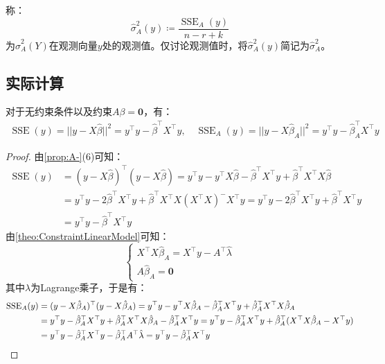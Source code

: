 \begin{definition}
	称：
	\begin{equation*}
		\hat{\sigma}_A^2(y)\coloneq\frac{\operatorname{SSE}_A(y)}{n-r+k}
	\end{equation*}
	为$\hat{\sigma}_A^2(Y)$在观测向量$y$处的观测值。仅讨论观测值时，将$\hat{\sigma}_A^2(y)$简记为$\hat{\sigma}_A^2$。
\end{definition}

\subsection{实际计算}
\begin{theorem}\label{theo:SSESSEACalculate}
	对于无约束条件以及约束$A\beta=\mathbf{0}$，有：
	\begin{gather*}
		\operatorname{SSE}(y)=||y-X\hat{\beta}||^2=y^{\top}y-\hat{\beta}^{\top}X^{\top}y,\quad
		\operatorname{SSE}_A(y)=||y-X\hat{\beta}_A||^2=y^{\top}y-\hat{\beta}_A^{\top}X^{\top}y
	\end{gather*}
\end{theorem}
\begin{proof}
	由\cref{prop:A-}(6)可知：
	\begin{align*}
		\operatorname{SSE}(y)&=(y-X\hat{\beta})^{\top}(y-X\hat{\beta})=y^{\top}y-y^{\top}X\hat{\beta}-\hat{\beta}^{\top}X^{\top}y+\hat{\beta}^{\top}X^{\top}X\hat{\beta} \\
		&=y^{\top}y-2\hat{\beta}^{\top}X^{\top}y+\hat{\beta}^{\top}X^{\top}X(X^{\top}X)^-X^{\top}y=y^{\top}y-2\hat{\beta}^{\top}X^{\top}y+\hat{\beta}^{\top}X^{\top}y \\
		&=y^{\top}y-\hat{\beta}^{\top}X^{\top}y
	\end{align*}
	由\cref{theo:ConstraintLinearModel}可知：
	\begin{equation*}
		\begin{cases}
			X^{\top}X\hat{\beta}_A=X^{\top}y-A^{\top}\hat{\lambda} \\
			A\hat{\beta}_A=\mathbf{0}
		\end{cases}
	\end{equation*}
	其中$\lambda$为Lagrange乘子，于是有：
	\begin{align*}
		\operatorname{SSE}_A(y)&=(y-X\hat{\beta}_A)^{\top}(y-X\hat{\beta}_A)=y^{\top}y-y^{\top}X\hat{\beta}_A-\hat{\beta}_A^{\top}X^{\top}y+\hat{\beta}_A^{\top}X^{\top}X\hat{\beta}_A \\
		&=y^{\top}y-\hat{\beta}_A^{\top}X^{\top}y+\hat{\beta}_A^{\top}X^{\top}X\hat{\beta}_A-\hat{\beta}_A^{\top}X^{\top}y=y^{\top}y-\hat{\beta}_A^{\top}X^{\top}y+\hat{\beta}_A^{\top}(X^{\top}X\hat{\beta}_A-X^{\top}y) \\
		&=y^{\top}y-\hat{\beta}_A^{\top}X^{\top}y-\hat{\beta}_A^{\top}A^{\top}\hat{\lambda}=y^{\top}y-\hat{\beta}_A^{\top}X^{\top}y\qedhere
	\end{align*}
\end{proof}
